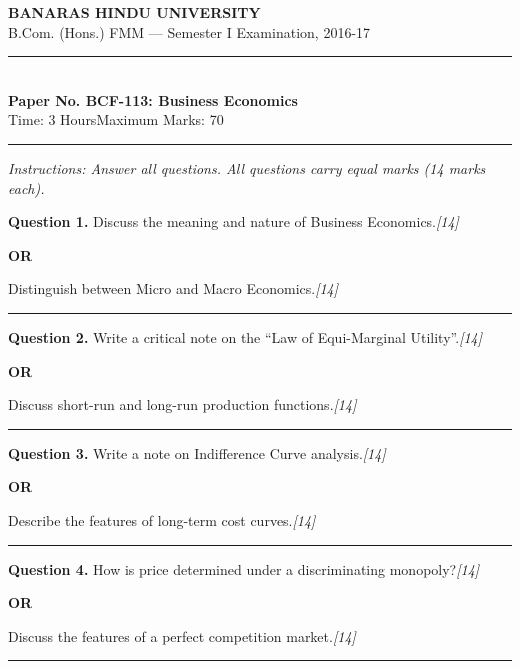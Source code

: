 \documentclass[11pt,a4paper]{article}
\newcommand{\pts}[1]{\hfill   \textit{[#1]}}
\begin{document}
\begin{center}
  {\large\bfseries BANARAS HINDU UNIVERSITY}\\[2pt]
  {\normalsize B.Com. (Hons.) FMM --- Semester I Examination, 2016-17}\\[6pt]
  \rule{0.8\linewidth}{0.5pt}\\[6pt]
  {\large\bfseries Paper No. BCF-113: Business Economics}\\[4pt]
  {\normalsize Time: 3 Hours\hfill Maximum Marks: 70}
\end{center}

\rule{\linewidth}{0.4pt}

\smallskip



\noindent   \textit{Instructions: Answer all questions. All questions carry equal marks (14 marks each).}

\bigskip




\noindent   \textbf{Question 1.}
Discuss the meaning and nature of Business Economics.\pts{14}

\centerline{   \textbf{OR}}

Distinguish between Micro and Macro Economics.\pts{14}

\medskip\rule{\linewidth}{0.2pt}




\noindent   \textbf{Question 2.}
Write a critical note on the ``Law of Equi-Marginal Utility''.\pts{14}

\centerline{   \textbf{OR}}

Discuss short-run and long-run production functions.\pts{14}

\medskip\rule{\linewidth}{0.2pt}




\noindent   \textbf{Question 3.}
Write a note on Indifference Curve analysis.\pts{14}

\centerline{   \textbf{OR}}

Describe the features of long-term cost curves.\pts{14}

\medskip\rule{\linewidth}{0.2pt}




\noindent   \textbf{Question 4.}
How is price determined under a discriminating monopoly?\pts{14}

\centerline{   \textbf{OR}}

Discuss the features of a perfect competition market.\pts{14}

\medskip\rule{\linewidth}{0.2pt}
\end{document}
